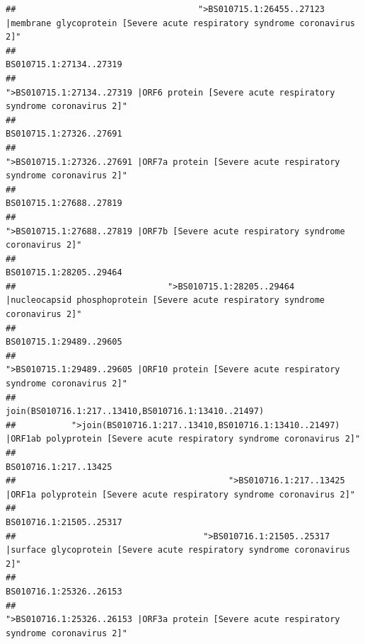 \documentclass[
]{article}
\begin{document}
\begin{verbatim}
##                                    ">BS010715.1:26455..27123 |membrane glycoprotein [Severe acute respiratory syndrome coronavirus 2]" 
##                                                                                                                BS010715.1:27134..27319 
##                                             ">BS010715.1:27134..27319 |ORF6 protein [Severe acute respiratory syndrome coronavirus 2]" 
##                                                                                                                BS010715.1:27326..27691 
##                                            ">BS010715.1:27326..27691 |ORF7a protein [Severe acute respiratory syndrome coronavirus 2]" 
##                                                                                                                BS010715.1:27688..27819 
##                                                    ">BS010715.1:27688..27819 |ORF7b [Severe acute respiratory syndrome coronavirus 2]" 
##                                                                                                                BS010715.1:28205..29464 
##                              ">BS010715.1:28205..29464 |nucleocapsid phosphoprotein [Severe acute respiratory syndrome coronavirus 2]" 
##                                                                                                                BS010715.1:29489..29605 
##                                            ">BS010715.1:29489..29605 |ORF10 protein [Severe acute respiratory syndrome coronavirus 2]" 
##                                                                                    join(BS010716.1:217..13410,BS010716.1:13410..21497) 
##           ">join(BS010716.1:217..13410,BS010716.1:13410..21497) |ORF1ab polyprotein [Severe acute respiratory syndrome coronavirus 2]" 
##                                                                                                                  BS010716.1:217..13425 
##                                          ">BS010716.1:217..13425 |ORF1a polyprotein [Severe acute respiratory syndrome coronavirus 2]" 
##                                                                                                                BS010716.1:21505..25317 
##                                     ">BS010716.1:21505..25317 |surface glycoprotein [Severe acute respiratory syndrome coronavirus 2]" 
##                                                                                                                BS010716.1:25326..26153 
##                                            ">BS010716.1:25326..26153 |ORF3a protein [Severe acute respiratory syndrome coronavirus 2]" 

\end{verbatim}
\end{document}
